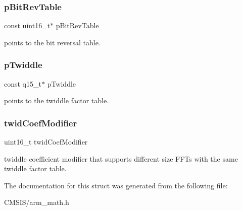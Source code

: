 \subsubsection{\texorpdfstring{pBitRevTable}{pBitRevTable}}
{\footnotesize\ttfamily const uint16\+\_\+t$\ast$ p\+Bit\+Rev\+Table}

points to the bit reversal table. \mbox{\label{structarm__cfft__radix4__instance__q15_a7f19217cfa0370f9e518caa882265386}} 
\subsubsection{\texorpdfstring{pTwiddle}{pTwiddle}}
{\footnotesize\ttfamily const q15\+\_\+t$\ast$ p\+Twiddle}

points to the twiddle factor table. \mbox{\label{structarm__cfft__radix4__instance__q15_afe772e5b5001c9d8e85032115a8df5bf}} 
\subsubsection{\texorpdfstring{twidCoefModifier}{twidCoefModifier}}
{\footnotesize\ttfamily uint16\+\_\+t twid\+Coef\+Modifier}

twiddle coefficient modifier that supports different size F\+F\+Ts with the same twiddle factor table. 

The documentation for this struct was generated from the following file\+:\begin{DoxyCompactItemize}
\item 
C\+M\+S\+I\+S/arm\+\_\+math.\+h\end{DoxyCompactItemize}
